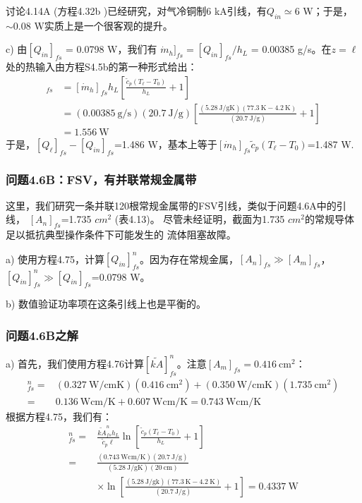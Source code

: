 讨论4.14A (方程4.32b )已经研究，对气冷铜制6 kA引线，有$Q_{in}\simeq$6 W；于是，
$\sim$0.08 W实质上是一个很客观的提升。

c) 由$[Q_{in}]_{fs}$ = 0.0798 W，我们有
$\dot{m}_h]_{fs}= [Q_{in}]_{fs}/h_L$ = 0.00385 g/s。在$z=\ell$处的热输入由方程S4.5b的第一种形式给出：
\begin{align*}
[Q_\ell]_{fs}&=[\dot{m}_h]_{fs}h_L\left[\frac{\tilde{c}_p(T_\ell-T_0)}{h_L}+1\right] \\
&=(0.00385\ \mathrm{g/s})(20.7\ \mathrm{J/g})\left[\frac{(5.28\ \mathrm{J/gK})(77.3\ \mathrm{K}-4.2\ \mathrm{K})}{(20.7\ \mathrm{J/g})}+1\right] \\
&=1.556\ \mathrm{W}
\end{align*}
于是，$[Q_\ell]_{fs}−[Q_{in}]_{fs}$=1.486 W，基本上等于$[\dot{m}_h]_{fs} \tilde{c}_p(T_\ell-T_0)$=1.487 W.

\subsubsection{问题4.6B：FSV，有并联常规金属带}
这里，我们研究一条并联120根常规金属带的FSV引线，类似于问题4.6A中的引线，
$[A_n]_{fs}$=1.735 $cm^2$ (表4.13)。
尽管未经证明，截面为1.735 $cm^2$的常规导体足以抵抗典型操作条件下可能发生的
流体阻塞故障。

a) 使用方程4.75，计算$[Q_{in}]_{fs}^n$。因为存在常规金属，$[A_n]_{fs}\gg [A_m]_{fs}$，
$[Q_{in}]_{fs}^n\gg[Q_{in}]_{fs}$=0.0798 W。

b) 数值验证功率项在这条引线上也是平衡的。

\subsubsection{问题4.6B之解}
a) 首先，我们使用方程4.76计算$[\tilde{kA}]_{fs}^{n}$。注意$[A_m]_{fs}=0.416\ \mathrm{cm^2}$：
\begin{align*}
[\tilde{kA}]_{fs}^{n}=&(0.327\ \mathrm{W/cm K})(0.416\ \mathrm{cm^2})+(0.350\ \mathrm{W/cmK})(1.735\ \mathrm{cm^2}) \\
=&0.136\ \mathrm{W cm/K}+0.607\ \mathrm{W cm/K}=0.743\ \mathrm{W cm/K}
\end{align*}
根据方程4.75，我们有：
\begin{align*}%
[Q_{in}]_{fs}^{n}=&\frac{\tilde{kA}_{fs}^{n}h_L}{\tilde{c}_p\ell}\ln\left[\frac{\tilde{c}_p(T_\ell-T_0)}{h_L}+1\right] \\ \tag{4.75}
=&\frac{(0.743\ \mathrm{W cm/K})(20.7\ \mathrm{J/g})}{(5.28\ \mathrm{J/gK})(20\ \mathrm{cm})} \\
&\times\ln\left[\frac{(5.28\ \mathrm{J/gk})(77.3\ \mathrm{K}-4.2\ \mathrm{K})}{(20.7\ \mathrm{J/g})}+1\right]=0.4337\ \mathrm{W}
\end{align*}

